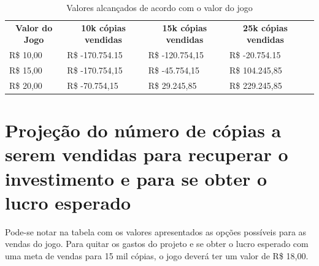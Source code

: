 \documentclass[12pt]{article}
\begin{document}
\begin{table}[h]
\centering
\begin{tabular}{|l|l|l|l|l}
\cline{1-4}
\multicolumn{1}{|c|}{\textbf{Valor do Jogo}} & \multicolumn{1}{c|}{\textbf{10k cópias vendidas}} & \multicolumn{1}{c|}{\textbf{15k cópias vendidas}} & \multicolumn{1}{c|}{\textbf{25k cópias vendidas}} &  \\ \cline{1-4}
R\$ 10,00                                    & R\$ -170.754.15                                        & R\$ -120.754,15                                        & R\$ -20.754.15                                     &  \\ \cline{1-4}
R\$ 15,00                                    & R\$ -170.754,15 &
R\$ -45.754,15                                        & R\$ 104.245,85                                     &  \\ \cline{1-4}
R\$ 20,00                                    & R\$ -70.754,15                                       & R\$ 29.245,85                                        & R\$ 229.245,85                                     &  \\ \cline{1-4}
\end{tabular}
\caption{Valores alcançados de acordo com o valor do jogo}
\end{table}

\section{Projeção do número de cópias a serem vendidas para recuperar o
	    investimento e para se obter o lucro esperado}

Pode-se notar na tabela com os valores apresentados as opções possíveis para as vendas do jogo. Para quitar os gastos do projeto e se obter o lucro esperado com uma meta de vendas para 15 mil cópias, o jogo deverá ter um valor de R\$ 18,00.
\end{document}
